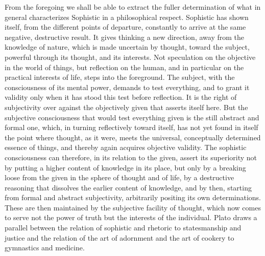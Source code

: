 From the foregoing we shall be able to extract the fuller determination of
what in general characterizes Sophistic in a philosophical respect. Sophistic
has shown itself, from the different points of departure, constantly to
arrive at the same negative, destructive result. It gives thinking a new
direction, away from the knowledge of nature,
 \setcounter{footnote}{0}
which is made uncertain by thought, toward the subject, powerful through its
thought, and its interests. Not speculation on the objective in the world of
things, but reflection on the human, and in particular on the practical
interests of life, steps into the foreground. The subject, with the
consciousness of its mental power, demands to test everything, and to grant
it validity only when it has stood this test before reflection. It is the
right of subjectivity over against the objectively given that asserts itself
here. But the subjective consciousness that would test everything given is
the still abstract and formal one, which, in turning reflectively toward
itself, has not yet found in itself the point where thought, as it were,
meets the universal, conceptually determined essence of things, and thereby
again acquires objective validity. The sophistic consciousness can
therefore, in its relation to the given, assert its superiority not by
putting a higher content of knowledge in its place, but only by a breaking
loose from the given in the sphere of thought and of life, by a destructive
reasoning that dissolves the earlier content of knowledge, and by then,
starting from formal and abstract subjectivity, arbitrarily positing its own
determinations. These are then maintained by the subjective facility of
thought, which now comes to serve not the power of truth but the interests of
the individual. Plato draws a parallel between the relation of sophistic and
rhetoric to statesmanship and justice and the relation of the art of
adornment and the art of cookery to gymnastics and medicine.

